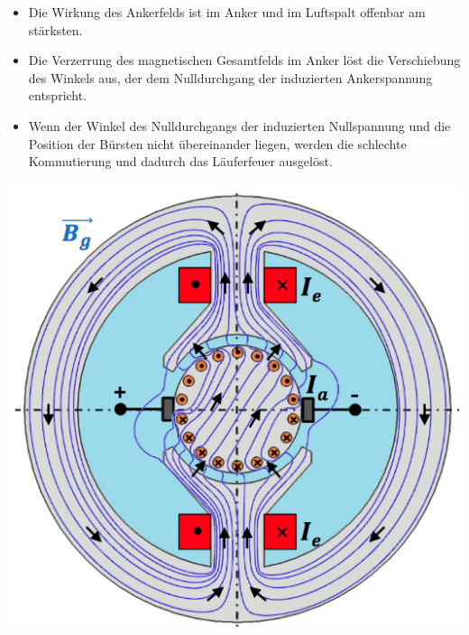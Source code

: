 \begin{minipage}{0.6 \linewidth}
\begin{itemize}
\item Die Wirkung des Ankerfelds ist im Anker und im Luftspalt offenbar am stärksten.
\item Die Verzerrung des magnetischen Gesamtfelds im Anker löst die Verschiebung des Winkels aus, der dem Nulldurchgang der induzierten Ankerspannung entspricht.
\item Wenn der Winkel des Nulldurchgangs der induzierten Nullspannung und die Position der Bürsten nicht übereinander liegen, werden die schlechte Kommutierung und dadurch das Läuferfeuer ausgelöst.
\end{itemize}
\end{minipage}
\begin{minipage}{0.4 \linewidth}
\includegraphics[width = \linewidth]{./Pics/VL45/Ankerruek4}
\end{minipage}

